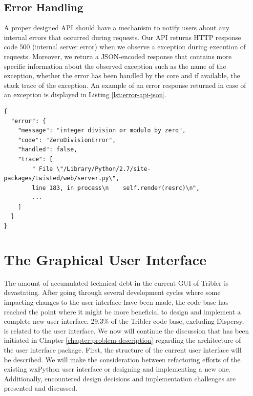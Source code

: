 \subsection{Error Handling}
\label{subsec:error-handling-api}
A proper designed API should have a mechanism to notify users about any internal errors that occurred during requests. Our API returns HTTP response code 500 (internal server error) when we observe a exception during execution of requests. Moreover, we return a JSON-encoded response that contains more specific information about the observed exception such as the name of the exception, whether the error has been handled by the core and if available, the stack trace of the exception. An example of an error response returned in case of an exception is displayed in Listing \ref{lst:error-api-json}.

\begin{lstlisting}[caption={The response in JSON format returned when an exception is observed in Tribler during the processing of an API request.},label={lst:error-api-json}]
{
  "error": {
    "message": "integer division or modulo by zero",
    "code": "ZeroDivisionError",
    "handled": false,
    "trace": [
        " File \"/Library/Python/2.7/site-packages/twisted/web/server.py\", 
        line 183, in process\n    self.render(resrc)\n", 
        ...
    ]
  }
}
\end{lstlisting}

\section{The Graphical User Interface}
The amount of accumulated technical debt in the current GUI of Tribler is devastating. After going through several development cycles where some impacting changes to the user interface have been made, the code base has reached the point where it might be more beneficial to design and implement a complete new user interface. 29,3\% of the Tribler code base, excluding Dispersy, is related to the user interface. We now will continue the discussion that has been initiated in Chapter \ref{chapter:problem-description} regarding the architecture of the user interface package. First, the structure of the current user interface will be described. We will make the consideration between refactoring efforts of the existing wxPython user interface or designing and implementing a new one. Additionally, encountered design decisions and implementation challenges are presented and discussed.


